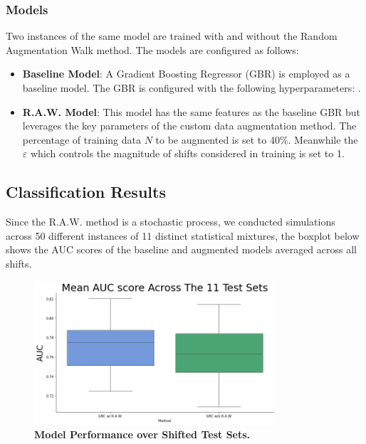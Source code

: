\subsubsection{Models}
Two instances of the same model are trained with and without the Random Augmentation Walk method. The models are configured as follows:
\begin{itemize}
    \item \textbf{Baseline Model}: A Gradient Boosting Regressor (GBR) is employed as a baseline model. The GBR is configured with the following hyperparameters: .
    \item \textbf{R.A.W. Model}: This model has the same features as the baseline GBR but leverages the key parameters of the custom data augmentation method. The percentage of training data $N$ to be augmented is set to 40\%. Meanwhile the $\varepsilon$ which controls the magnitude of shifts considered in training is set to 1.
\end{itemize}




\subsection{Classification Results}


Since the R.A.W. method is a stochastic process, we conducted simulations across 50 different instances of 11 distinct statistical mixtures, the boxplot below shows the AUC scores of the baseline and augmented models averaged across all shifts.

\begin{figure}[H]
    \centering
    \includegraphics[width=0.8\textwidth]{assets/MeanAUCscoreacross10.png} 
    \caption{\textbf{Model Performance over Shifted Test Sets.}}
\end{figure}

